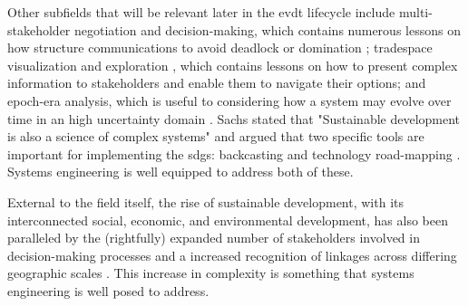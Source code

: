Other subfields that will be relevant later in the \ac{evdt} lifecycle include multi-stakeholder negotiation and decision-making, which contains numerous lessons on how structure communications to avoid deadlock or domination \cite{fitzgeraldEffectsEnhancedMultiparty2015,fitzgeraldRecommendationsFramingMultistakeholder2016,weckMULTISTAKEHOLDERSIMULATIONGAMING2012}; tradespace visualization and exploration \cite{fitzgeraldEffectsEnhancedMultiparty2015,fitzgeraldRecommendationsFramingMultistakeholder2016,groganInteractiveModelsSystem2015,rossMultiAttributeTradespaceExploration2004,selvavaleroRulebasedSystemArchitecting2012}, which contains lessons on how to present complex information to stakeholders and enable them to navigate their options; and epoch-era analysis, which is useful to considering how a system may evolve over time in an high uncertainty domain \cite{rossUsingNaturalValueCentric2008,vascikMethodExploringProgram2015}. Sachs stated that "Sustainable development is also a science of complex systems" and argued that two specific tools are important for implementing the \acp{sdg}: backcasting and technology road-mapping \cite{sachsAgeSustainableDevelopment2015}. Systems engineering is well equipped to address both of these.


External to the field itself, the rise of sustainable development, with its interconnected social, economic, and environmental development, has also been paralleled by the (rightfully) expanded number of stakeholders involved in decision-making processes and a increased recognition of linkages across differing geographic scales \cite{brommelstroetPlanningSupportSystems2010}. This increase in complexity is something that systems engineering is well posed to address.




